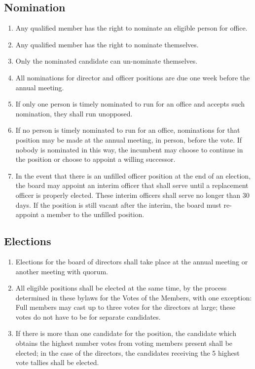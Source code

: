 \documentclass{article}
\begin{document}
  \subsection{Nomination}
    \begin{enumerate}
      \item Any qualified member has the right to nominate an eligible person for office.
      \item Any qualified member has the right to nominate themselves.
      \item Only the nominated candidate can un-nominate themselves.
      \item All nominations for director and officer positions are due one week
      before the annual meeting.
      \item If only one person is timely nominated to run for an office and accepts such
      nomination, they shall run unopposed.
      \item If no person is timely nominated to run for an office, nominations for
      that position may be made at the annual meeting, in person, before the vote.
      If nobody is nominated in this way, the incumbent may choose to continue in
      the position or choose to appoint a willing successor.
      \item In the event that there is an unfilled officer position at the end
      of an election, the board may appoint an interim officer that shall serve
      until a replacement officer is properly elected. These interim officers shall
      serve no longer than 30 days. If the position is still vacant after the interim,
      the board must re-appoint a member to the unfilled position.
    \end{enumerate}
  \subsection{Elections}
    \begin{enumerate}
      \item Elections for the board of directors shall take place at the annual meeting or another
      meeting with quorum.
      \item All eligible positions shall be elected at the same time, by the process determined in
      these bylaws for the Votes of the Members, with one exception:  Full members may cast up
      to three votes for the directors at large;  these votes do not have to be for separate
      candidates.
      \item If there is more than one candidate for the position, the candidate which obtains the
      highest number votes from voting members present shall be elected;  in the case of the
      directors, the candidates receiving the 5 highest vote tallies shall be elected.
    \end{enumerate}
\end{document}

